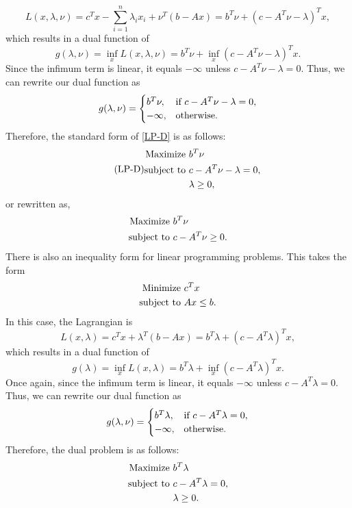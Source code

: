 	$$
	L(x, \lambda, \nu) = c^T x - \sum_{i = 1}^{n} \lambda_i x_i + \nu^T (b - Ax) = b^T \nu + (c - A^T \nu - \lambda)^T x,
	$$
	which results in a dual function of
	$$
		g(\lambda, \nu) = \inf_x L(x, \lambda, \nu) = b^T \nu + \inf_x (c - A^T \nu - \lambda)^T x.
	$$	
	Since the infimum term is linear, it equals $-\infty$ unless $c - A^T \nu - \lambda = 0$. Thus, we can rewrite our dual function as
	$$
	g(\lambda, \nu) = 
	\begin{cases}
		b^T \nu, &\textnormal{if } c - A^T \nu - \lambda = 0,\\
		-\infty, &\textnormal{otherwise.}
	\end{cases}
	$$
	Therefore, the standard form of \eqref{LP-D} is as follows:
		\begin{equation} \label{LP-D} \tag{LP-D}
			\begin{split}
				\textnormal{Maximize } & b^T \nu \\
				\textnormal{subject to } & c - A^T \nu - \lambda = 0, \\
				& \lambda \geq 0, 
			\end{split}
		\end{equation}
	or rewritten as, 
	\begin{equation} 
		\begin{split}
			\textnormal{Maximize } & b^T \nu \\
			\textnormal{subject to } & c - A^T \nu \geq 0.
		\end{split}
	\end{equation}
	There is also an inequality form for linear programming problems. This takes the form
	\begin{equation} 
		\begin{split}
			\textnormal{Minimize } & c^T x \\
			\textnormal{subject to } & Ax \leq b.
		\end{split}
	\end{equation}
	 In this case, the Lagrangian is
	$$
	L(x, \lambda) = c^T x + \lambda^T (b - Ax) = b^T \lambda + (c - A^T \lambda)^T x,
	$$
	which results in a dual function of
	$$
	g(\lambda) = \inf_x L(x, \lambda) = b^T \lambda + \inf_x (c - A^T \lambda)^T x.
	$$	
	Once again, since the infimum term is linear, it equals $-\infty$ unless $c - A^T \lambda = 0$. Thus, we can rewrite our dual function as
	$$
	g(\lambda, \nu) = 
	\begin{cases}
		b^T \lambda, &\textnormal{if } c - A^T \lambda= 0,\\
		-\infty, &\textnormal{otherwise.}
	\end{cases}
	$$
	Therefore, the dual problem is as follows:
	\begin{equation} 
		\begin{split}
			\textnormal{Maximize } & b^T \lambda \\
			\textnormal{subject to } & c - A^T \lambda= 0, \\
			& \lambda \geq 0. 
		\end{split}
	\end{equation}
	
